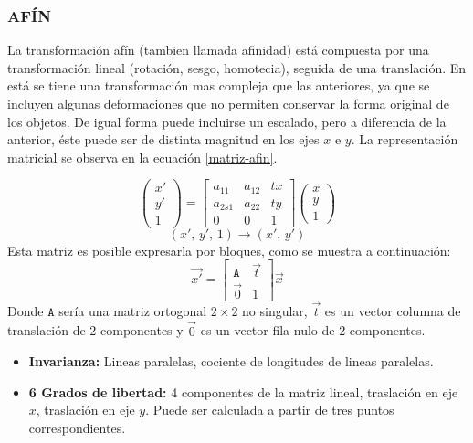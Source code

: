 \subsubsection*{AFÍN}

La transformación afín (tambien llamada afinidad) está compuesta por una transformación lineal (rotación, sesgo, homotecia), seguida de una translación. En está se tiene una transformación mas compleja que las anteriores, ya que se incluyen algunas deformaciones que no permiten conservar la forma original de los objetos. De igual forma puede incluirse un escalado, pero a diferencia de la anterior, éste puede ser de distinta magnitud en los ejes $x$ e $y$. La representación matricial se observa en la ecuación \ref{matriz-afin}.

\begin{equation}
\begin{pmatrix}
{x'}\\{y'}\\{1}
\end{pmatrix} = 
\begin{bmatrix}
{a_{11}}&{a_{12}}&{tx}\\
{a_{2s1}}&{a_{22}}&{ty}\\
{0}&{0}&{1}
\end{bmatrix}
\begin{pmatrix}
{x}\\{y}\\{1}
\end{pmatrix}
\label{matriz-afin}
\end{equation}
\begin{displaymath}
(x', \,y', \,1) \to (x',\, y')
\end{displaymath}
Esta matriz es posible expresarla por bloques, como se muestra a continuación:
\begin{displaymath}
\vec{x'}= 
\begin{bmatrix}
{\mathtt{A}}&{\vec{t}}\\
{\vec{0}}&{1}
\end{bmatrix}
\vec{x}
\label{bloque-afin}
\end{displaymath}
Donde $ \mathtt{A} $ sería una matriz ortogonal $2\times2$ no singular, $\vec{t} $ es un vector columna de translación de 2 componentes y $\vec{0} $ es un vector fila nulo de 2 componentes.

\begin{itemize}
	\item \textbf{Invarianza:} Lineas paralelas, cociente de longitudes de lineas paralelas.
	\item \textbf{6 Grados de libertad:} 4 componentes de la matriz lineal, traslación en eje $x$, traslación en eje $y$. Puede ser calculada a partir de tres puntos correspondientes.
\end{itemize}

